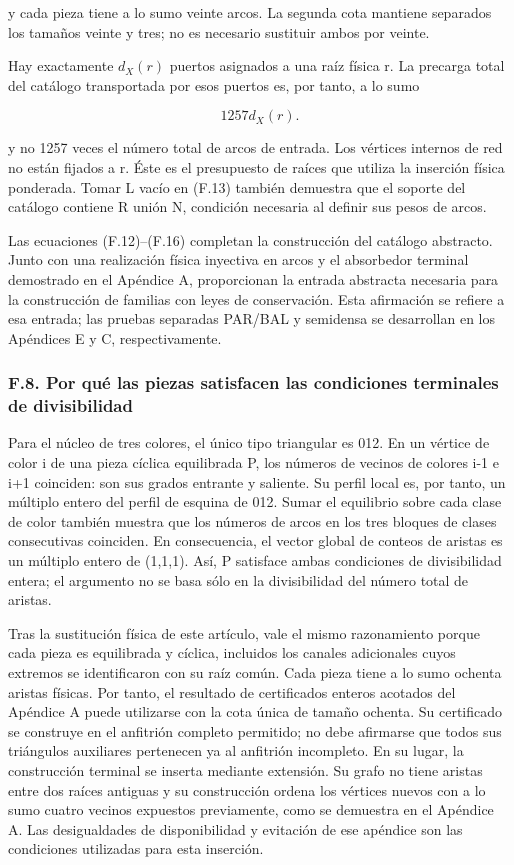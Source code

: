 \documentclass[spanish,11pt,a4paper]{article}
\begin{document}
y cada pieza tiene a lo sumo veinte arcos. La segunda cota mantiene separados los tamaños veinte y tres; no es necesario sustituir ambos por veinte.

Hay exactamente \(d_{X}(r)\) puertos asignados a una raíz física r. La precarga total del catálogo transportada por esos puertos es, por tanto, a lo sumo

\[1257d_X(r).\tag{F.16}\]

y no 1257 veces el número total de arcos de entrada. Los vértices internos de red no están fijados a r. Éste es el presupuesto de raíces que utiliza la inserción física ponderada. Tomar L vacío en (F.13) también demuestra que el soporte del catálogo contiene R unión N, condición necesaria al definir sus pesos de arcos.

Las ecuaciones (F.12)--(F.16) completan la construcción del catálogo abstracto. Junto con una realización física inyectiva en arcos y el absorbedor terminal demostrado en el Apéndice A, proporcionan la entrada abstracta necesaria para la construcción de familias con leyes de conservación. Esta afirmación se refiere a esa entrada; las pruebas separadas PAR/BAL y semidensa se desarrollan en los Apéndices E y C, respectivamente.

\subsubsection{F.8. Por qué las piezas satisfacen las condiciones terminales de divisibilidad}\label{f.8.-por-quuxe9-las-piezas-satisfacen-las-condiciones-terminales-de-divisibilidad}

Para el núcleo de tres colores, el único tipo triangular es 012. En un vértice de color i de una pieza cíclica equilibrada P, los números de vecinos de colores i-1 e i+1 coinciden: son sus grados entrante y saliente. Su perfil local es, por tanto, un múltiplo entero del perfil de esquina de 012. Sumar el equilibrio sobre cada clase de color también muestra que los números de arcos en los tres bloques de clases consecutivas coinciden. En consecuencia, el vector global de conteos de aristas es un múltiplo entero de (1,1,1). Así, P satisface ambas condiciones de divisibilidad entera; el argumento no se basa sólo en la divisibilidad del número total de aristas.

Tras la sustitución física de este artículo, vale el mismo razonamiento porque cada pieza es equilibrada y cíclica, incluidos los canales adicionales cuyos extremos se identificaron con su raíz común. Cada pieza tiene a lo sumo ochenta aristas físicas. Por tanto, el resultado de certificados enteros acotados del Apéndice A puede utilizarse con la cota única de tamaño ochenta. Su certificado se construye en el anfitrión completo permitido; no debe afirmarse que todos sus triángulos auxiliares pertenecen ya al anfitrión incompleto. En su lugar, la construcción terminal se inserta mediante extensión. Su grafo no tiene aristas entre dos raíces antiguas y su construcción ordena los vértices nuevos con a lo sumo cuatro vecinos expuestos previamente, como se demuestra en el Apéndice A. Las desigualdades de disponibilidad y evitación de ese apéndice son las condiciones utilizadas para esta inserción.
\end{document}
